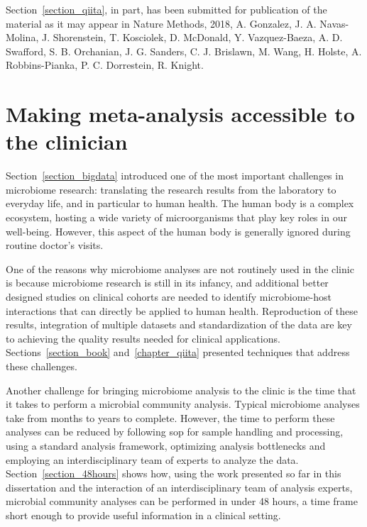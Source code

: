 \documentclass[12pt,chapterheads]{ucsd}
\begin{document}
Section~\ref{section_qiita}, in part, has been submitted for publication of the
material as it may appear in Nature Methods, 2018, A. Gonzalez, J. A. Navas-Molina,
J. Shorenstein, T. Kosciolek, D. McDonald, Y. Vazquez-Baeza, A. D. Swafford,
S. B. Orchanian, J. G. Sanders, C. J. Brislawn, M. Wang, H. Holste, A. Robbins-Pianka,
P. C. Dorrestein, R. Knight.



\chapter{Making meta-analysis accessible to the clinician}\label{chapter_rapid_response}
\glsresetall

Section~\ref{section_bigdata} introduced one of the most important challenges in
microbiome research: translating the research results from the laboratory to
everyday life, and in particular to human health. The human body is a complex ecosystem,
hosting a wide variety of microorganisms that play key roles in our well-being.
However, this aspect of the human body is generally ignored during routine
doctor's visits.

One of the reasons why microbiome analyses are not routinely used in the clinic
is because microbiome research is still in its infancy, and additional better designed
studies on clinical cohorts are needed to identify microbiome-host interactions
that can directly be applied to human health. Reproduction of these results,
integration of multiple datasets and standardization of the data are key to achieving
the quality results needed for clinical applications. Sections~\ref{section_book}
and~\ref{chapter_qiita} presented techniques that address these challenges.

Another challenge for bringing microbiome analysis to the clinic is the time that
it takes to perform a microbial community analysis. Typical microbiome
analyses take from months to years to complete. However, the time to
perform these analyses can be reduced by following \gls{sop} for sample handling
and processing, using a standard analysis framework, optimizing analysis
bottlenecks and employing an interdisciplinary team of experts to analyze the data.
Section~\ref{section_48hours} shows how, using the work presented so far in this
dissertation and the interaction of an interdisciplinary team of analysis experts,
microbial community analyses can be performed in under 48 hours, a time frame short
enough to provide useful information in a clinical setting.
\end{document}
